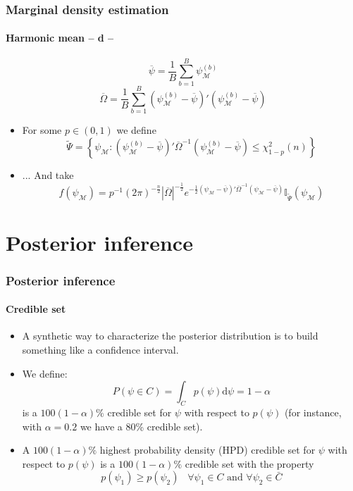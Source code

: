 \documentclass[10pt,slidestop]{beamer}
\begin{document}
\begin{frame}
  \frametitle{Marginal density estimation}
  \framesubtitle{Harmonic mean -- d --}


{\footnotesize
\[ \overline{\psi} =
\frac{1}{B}\sum_{b=1}^B\psi_{\mathcal{M}}^{(b)}
\]
}
{\footnotesize
\[ \overline{\Omega} =
\frac{1}{B}\sum_{b=1}^B(\psi_{\mathcal{M}}^{(b)}-\overline{\psi})'(\psi_{\mathcal{M}}^{(b)}
-\overline{\psi})
\]
}

\bigskip

\begin{itemize}
    \item For some $p\in (0,1)$ we define
    {\footnotesize
    \[\widetilde{\Psi} =
\left\{\psi_{\mathcal{M}}:(\psi_{\mathcal{M}}^{(b)}-\overline{\psi})'\overline{\Omega
}^{-1}(\psi_{\mathcal{M}}^{(b)}-\overline{\psi})\leq
    \chi_{1-p}^2(n)\right\}
    \]}

\bigskip

    \item ... And take
    {\footnotesize
    \[
        f(\psi_{\mathcal{M}}) =
p^{-1}(2\pi)^{-\frac{n}{2}}|\overline{\Omega}|^{-\frac{1}{2}}e^{-\frac{1}{2}(\psi_{\mathcal{M}}
-\overline{\psi})'\overline{\Omega}^{-1}(\psi_{\mathcal{M}}-\overline{\psi})}\mathbb{I}_{
\widetilde{\Psi}}(\psi_{\mathcal{M}})
    \]}
\end{itemize}

\end{frame}


\section{Posterior inference}

\begin{frame}
  \frametitle{Posterior inference}
  \framesubtitle{Credible set}

    \begin{itemize}
    \item A synthetic way to characterize the posterior distribution
    is to build something like a confidence interval.

\bigskip

    \item We define:
    \[
        P(\psi \in C) = \int_C p(\psi)\mathrm d\psi = 1-\alpha
    \]
    is a $100(1-\alpha)\%$ credible set for $\psi$ with respect to
    $p(\psi)$ (for instance, with $\alpha=0.2$ we have a 80\% credible set).

\bigskip

    \item A $100(1-\alpha)\%$ highest probability density (HPD) credible set
    for $\psi$ with respect to $p(\psi)$ is a $100(1-\alpha)\%$
    credible set with the property
    \[
        p(\psi_1) \ge p(\psi_2)\;\;\; \forall \psi_1 \in C \mbox{ and
        } \forall \psi_2 \in \bar C
    \]
    \end{itemize}

  \end{frame}
\end{document}
